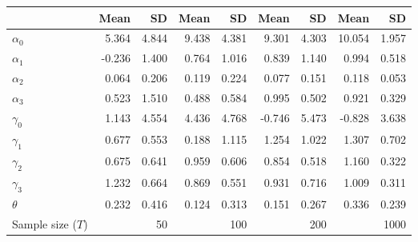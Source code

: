 
\begin{tabular}[t]{lrrrrrrrr}
\toprule
  & Mean & SD & Mean  & SD  & Mean   & SD   & Mean    & SD   \\
\midrule
$\alpha_{0}$ & 5.364 & 4.844 & 9.438 & 4.381 & 9.301 & 4.303 & 10.054 & 1.957\\
$\alpha_{1}$ & -0.236 & 1.400 & 0.764 & 1.016 & 0.839 & 1.140 & 0.994 & 0.518\\
$\alpha_{2}$ & 0.064 & 0.206 & 0.119 & 0.224 & 0.077 & 0.151 & 0.118 & 0.053\\
$\alpha_{3}$ & 0.523 & 1.510 & 0.488 & 0.584 & 0.995 & 0.502 & 0.921 & 0.329\\
$\gamma_{0}$ & 1.143 & 4.554 & 4.436 & 4.768 & -0.746 & 5.473 & -0.828 & 3.638\\
$\gamma_{1}$ & 0.677 & 0.553 & 0.188 & 1.115 & 1.254 & 1.022 & 1.307 & 0.702\\
$\gamma_{2}$ & 0.675 & 0.641 & 0.959 & 0.606 & 0.854 & 0.518 & 1.160 & 0.322\\
$\gamma_{3}$ & 1.232 & 0.664 & 0.869 & 0.551 & 0.931 & 0.716 & 1.009 & 0.311\\
$\theta$ & 0.232 & 0.416 & 0.124 & 0.313 & 0.151 & 0.267 & 0.336 & 0.239\\
Sample size ($T$) &  & 50 &  & 100 &  & 200 &  & 1000\\
\bottomrule
\end{tabular}
